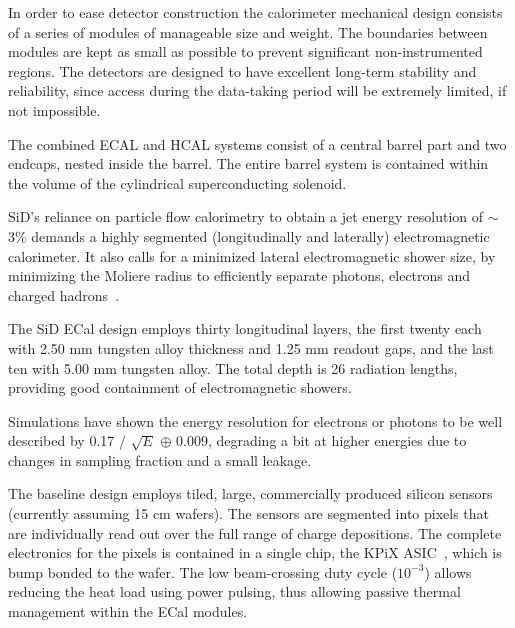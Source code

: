 In order to ease detector construction the calorimeter mechanical design consists of a series of modules of
manageable size and weight. The boundaries between
modules are kept as small as possible to prevent significant non-instrumented
regions. The detectors are designed to have excellent long-term stability and reliability,
since access during the data-taking period will be extremely limited, if not
impossible.

The combined ECAL and HCAL systems consist of a
central barrel part and two endcaps, nested inside the barrel. The entire barrel system is contained
within the volume of the cylindrical superconducting solenoid. 


SiD's reliance on particle flow calorimetry to obtain a jet energy resolution of  $\sim$3\% demands a highly segmented (longitudinally and laterally) electromagnetic calorimeter. It also calls for a minimized lateral electromagnetic shower size, by minimizing the Moliere radius to efficiently separate photons, electrons and charged hadrons~\cite{calor:2018}.

The SiD ECal design employs thirty longitudinal layers, the first twenty each with 2.50 mm tungsten alloy thickness and 1.25 mm readout gaps, and the last ten with 5.00 mm tungsten alloy.  The total depth is 26 radiation lengths, providing good containment of electromagnetic showers.

Simulations have shown the energy resolution for electrons or photons
to be well described by 0.17 / $\sqrt{E}$ $\oplus$ 0.009, degrading a
bit  at higher energies due to changes in sampling fraction and a small leakage.

The baseline design employs tiled, large, commercially produced silicon sensors (currently assuming 15 cm wafers). The sensors are segmented into pixels that are individually read out over the full range of charge depositions. The complete electronics for the pixels is contained in a single chip, the KPiX ASIC~\cite{Brau:2013yb}, which is bump bonded to the wafer. The low beam-crossing duty cycle ($10^{-3}$) allows reducing the heat load using power pulsing, thus allowing passive thermal management within the ECal modules.

